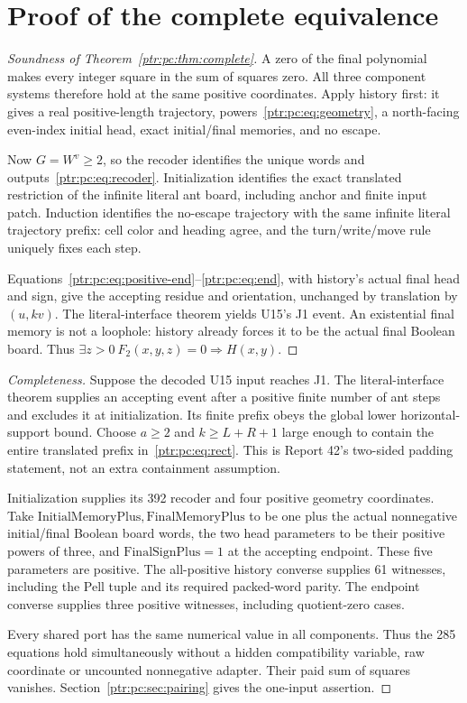 \documentclass[11pt,letterpaper]{article}
\theoremstyle{definition}\newtheorem{definition}[theorem]{Definition}
\theoremstyle{remark}\newtheorem{remark}[theorem]{Remark}
\newcommand{\IM}{\mathrm{InitialMemoryPlus}}\newcommand{\IH}{\mathrm{InitialHead}}
\newcommand{\FM}{\mathrm{FinalMemoryPlus}}\newcommand{\FH}{\mathrm{FinalHead}}
\newcommand{\FS}{\mathrm{FinalSignPlus}}
\begin{document}
\section{Proof of the complete equivalence}
\begin{proof}[Soundness of Theorem~\ref{ptr:pc:thm:complete}]
A zero of the final polynomial makes every integer square in the sum of squares zero. All three component systems therefore hold at the same positive coordinates. Apply history first: it gives a real positive-length trajectory, powers~\eqref{ptr:pc:eq:geometry}, a north-facing even-index initial head, exact initial/final memories, and no escape.

Now $G=W^v\ge2$, so the recoder identifies the unique words and outputs~\eqref{ptr:pc:eq:recoder}. Initialization identifies the exact translated restriction of the infinite literal ant board, including anchor and finite input patch. Induction identifies the no-escape trajectory with the same infinite literal trajectory prefix: cell color and heading agree, and the turn/write/move rule uniquely fixes each step.

Equations~\eqref{ptr:pc:eq:positive-end}--\eqref{ptr:pc:eq:end}, with history's actual final head and sign, give the accepting residue and orientation, unchanged by translation by $(u,kv)$. The literal-interface theorem yields U15's J1 event. An existential final memory is not a loophole: history already forces it to be the actual final Boolean board. Thus $\exists z>0\ F_2(x,y,z)=0\Rightarrow H(x,y)$.
\end{proof}
\begin{proof}[Completeness]
Suppose the decoded U15 input reaches J1. The literal-interface theorem supplies an accepting event after a positive finite number of ant steps and excludes it at initialization. Its finite prefix obeys the global lower horizontal-support bound. Choose $a\ge2$ and $k\ge L+R+1$ large enough to contain the entire translated prefix in~\eqref{ptr:pc:eq:rect}. This is Report 42's two-sided padding statement, not an extra containment assumption.

Initialization supplies its 392 recoder and four positive geometry coordinates. Take $\IM,\FM$ to be one plus the actual nonnegative initial/final Boolean board words, the two head parameters to be their positive powers of three, and $\FS=1$ at the accepting endpoint. These five parameters are positive. The all-positive history converse supplies 61 witnesses, including the Pell tuple and its required packed-word parity. The endpoint converse supplies three positive witnesses, including quotient-zero cases.

Every shared port has the same numerical value in all components. Thus the 285 equations hold simultaneously without a hidden compatibility variable, raw coordinate or uncounted nonnegative adapter. Their paid sum of squares vanishes. Section~\ref{ptr:pc:sec:pairing} gives the one-input assertion.
\end{proof}
\end{document}
